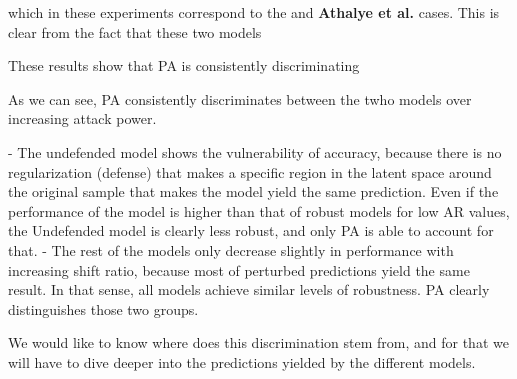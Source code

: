which in these experiments correspond to the  and 
{\color{tab:green} \textbf{Athalye et al.}} cases. This is clear from the fact that these
two models 


These results show that PA is consistently discriminating 

As we can see, PA consistently discriminates between the twho models over increasing
attack power.

- The undefended model shows the vulnerability of accuracy, because there is no regularization (defense) that makes a specific region in the latent space around the original sample that makes the model yield the same prediction. Even if the performance of the model is higher than that of robust models for low AR values, the Undefended model is clearly less robust, and only PA is able to account for that.
- The rest of the models only decrease slightly in performance with increasing shift ratio, because most of perturbed predictions yield the same result. In that sense, all models achieve similar levels of robustness. PA clearly distinguishes those two groups.

We would like to know where does this discrimination stem from, and for that we will have to dive deeper into the predictions yielded by the different models.


